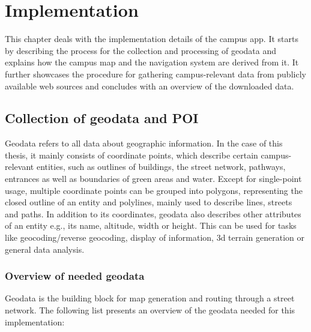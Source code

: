 \chapter{Implementation}
This chapter deals with the implementation details of the campus app. It starts by describing the process for the collection and processing of geodata and explains how the campus map and the navigation system are derived from it. It further showcases the procedure for gathering campus-relevant data from publicly available web sources and concludes with an overview of the downloaded data.

\label{cha:implementation}
\section{Collection of geodata and POI}
Geodata refers to all data about geographic information. In the case of this thesis, it mainly consists of coordinate points, which describe certain campus-relevant entities, such as outlines of buildings, the street network, pathways, entrances as well as boundaries of green areas and water. Except for single-point usage, multiple coordinate points can be grouped into polygons, representing the closed outline of an entity and polylines, mainly used to describe lines, streets and paths. In addition to its coordinates, geodata also describes other attributes of an entity e.g., its name, altitude, width or height. This can be used for tasks like geocoding/reverse geocoding, display of information, 3d terrain generation or general data analysis.

\subsection{Overview of needed geodata}
Geodata is the building block for map generation and routing through a street network. The following list presents an overview of the geodata needed for this implementation:

